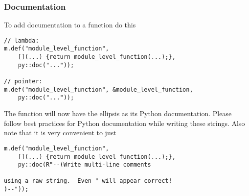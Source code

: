 \subsubsection{Documentation}
To add documentation to a function do this
\begin{verbatim}
// lambda:
m.def("module_level_function",
    [](...) {return module_level_function(...);},
    py::doc("..."));

// pointer:
m.def("module_level_function", &module_level_function,
    py::doc("..."));
\end{verbatim}
The function will now have the ellipsis as its Python documentation.  Please follow best practices for Python documentation while writing these strings.  Also
note that it is very convenient to just
\begin{verbatim}
m.def("module_level_function",
    [](...) {return module_level_function(...);},
    py::doc(R"--(Write multi-line comments

using a raw string.  Even " will appear correct!
)--"));
\end{verbatim}
